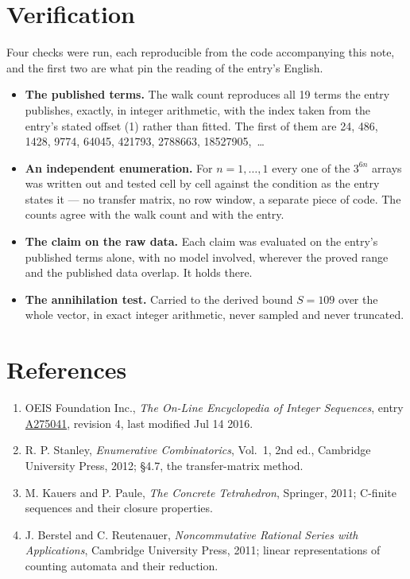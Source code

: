 \documentclass[11pt]{article}
\theoremstyle{definition}
\begin{document}
\section{Verification}

Four checks were run, each reproducible from the code accompanying this note, and the first two are what pin the reading of the entry's English.

\begin{itemize}

\item {\bfseries The published terms.} The walk count reproduces all 19 terms the entry publishes, exactly, in integer arithmetic, with the index taken from the entry's stated offset (1) rather than fitted. The first of them are 24, 486, 1428, 9774, 64045, 421793, 2788663, 18527905,~\dots

\item {\bfseries An independent enumeration.} For $n = 1,\dots,1$ every one of the $3^{6n}$ arrays was written out and tested cell by cell against the condition as the entry states it --- no transfer matrix, no row window, a separate piece of code. The counts agree with the walk count and with the entry.

\item {\bfseries The claim on the raw data.} Each claim was evaluated on the entry's published terms alone, with no model involved, wherever the proved range and the published data overlap. It holds there.

\item {\bfseries The annihilation test.} Carried to the derived bound $S = 109$ over the whole vector, in exact integer arithmetic, never sampled and never truncated.

\end{itemize}

\section{References}

\begin{enumerate}

\item OEIS Foundation Inc., \emph{The On-Line Encyclopedia of Integer Sequences}, entry \href{https://oeis.org/A275041}{A275041}, revision 4, last modified Jul 14 2016.

\item R. P. Stanley, \emph{Enumerative Combinatorics}, Vol.~1, 2nd ed., Cambridge University Press, 2012; \S4.7, the transfer-matrix method.

\item M. Kauers and P. Paule, \emph{The Concrete Tetrahedron}, Springer, 2011; C-finite sequences and their closure properties.

\item J. Berstel and C. Reutenauer, \emph{Noncommutative Rational Series with Applications}, Cambridge University Press, 2011; linear representations of counting automata and their reduction.

\end{enumerate}
\end{document}

